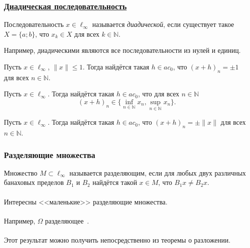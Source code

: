 \begin{frame}\frametitle{\underline{Диадическая последовательность}}
	\begin{ddefinition}
		Последовательность $x\in\ell_\infty$
		называется \emph{диадической}, если существует такое $X=\{a;b\}$,
		что $x_k \in X$ для всех $k\in \mathbb N$.
	\end{ddefinition}

	Например, диадическими являются все последовательности из нулей и единиц.


	\begin{llemma}
		Пусть $x\in\ell_\infty$, $\|x\|\leq 1$.
		Тогда найдётся такая $h\in ac_0$, что $(x+h)_n = \pm 1$ для всех $n\in\mathbb N$.
	\end{llemma}

	\begin{ccorollary}
		Пусть $x\in\ell_\infty$.
		Тогда найдётся такая $h\in ac_0$, что для всех $n\in\mathbb N$
		\begin{equation*}
			(x+h)_n \in \{\inf_{n\in\mathbb N} x_n,\sup_{n\in\mathbb N} x_n\}
			.
		\end{equation*}
	\end{ccorollary}
	\vspace{-2em}
	\begin{ccorollary}
		Пусть $x\in\ell_\infty$.
		Тогда найдётся такая $h\in ac_0$, что $(x+h)_n =\pm \|x\|$ для всех $n\in\mathbb N$.
	\end{ccorollary}

	\vfill
\end{frame}




\begin{frame}\frametitle{Разделяющие множества}
	\label{page:p_q_linhulls}
	Множество $M\subset \ell_\infty$ называется разделяющим,
	если для любых двух различных банаховых пределов $B_1$ и $B_2$
	найдётся такой $x\in M$, что $B_1 x \ne B_2 x$.
	\\~\\
	Интересны <<маленькие>> разделяющие множества.
	\\~\\
	Например, $\Omega$ разделяющее~\cite{semenov2010characteristic}.
	\\~\\
	Этот результат можно получить непосредственно из теоремы о разложении.
\end{frame}





